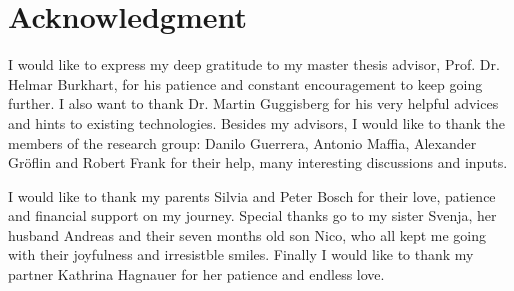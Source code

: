 \chapter*{Acknowledgment}
I would like to express my deep gratitude to my master thesis advisor, Prof. Dr. Helmar Burkhart, for his patience and constant encouragement to keep going further.
I also want to thank Dr. Martin Guggisberg for his very helpful advices and hints to existing technologies.
Besides my advisors, I would like to thank the members of the research group: Danilo Guerrera,
Antonio Maffia, Alexander Gr\"oflin and Robert Frank for their help, many interesting discussions and inputs.

I would like to thank my parents Silvia and Peter Bosch for their love, patience and financial support on my journey.
Special thanks go to my sister Svenja, her husband Andreas and their seven months old son Nico, who all kept me going with their joyfulness and irresistble smiles.
Finally I would like to thank my partner Kathrina Hagnauer for her patience and endless love.
